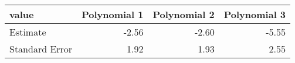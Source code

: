\begin{tabular}{lrrr}
  \hline
value & Polynomial 1 & Polynomial 2 & Polynomial 3 \\ 
  \hline
Estimate & -2.56 & -2.60 & -5.55 \\ 
  Standard Error & 1.92 & 1.93 & 2.55 \\ 
   \hline
\end{tabular}
